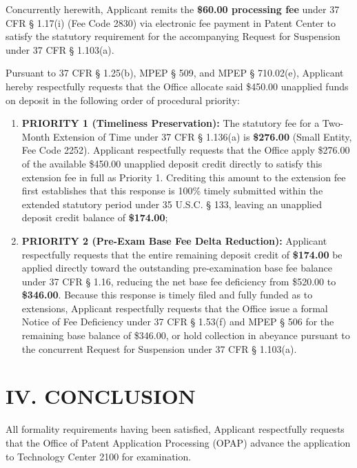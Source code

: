 \documentclass[11pt,letterpaper]{article}
\begin{document}
Concurrently herewith, Applicant remits the \textbf{\$60.00 processing fee} under 37 CFR \S{} 1.17(i) (Fee Code 2830) via electronic fee payment in Patent Center to satisfy the statutory requirement for the accompanying Request for Suspension under 37 CFR \S{} 1.103(a).

Pursuant to 37 CFR \S{} 1.25(b), MPEP \S{} 509, and MPEP \S{} 710.02(e), Applicant hereby respectfully requests that the Office allocate said \$450.00 unapplied funds on deposit in the following order of procedural priority:
\begin{enumerate}[leftmargin=*]
    \item \textbf{PRIORITY 1 (Timeliness Preservation):} The statutory fee for a Two-Month Extension of Time under 37 CFR \S{} 1.136(a) is \textbf{\$276.00} (Small Entity, Fee Code 2252). Applicant respectfully requests that the Office apply \$276.00 of the available \$450.00 unapplied deposit credit directly to satisfy this extension fee in full as Priority 1. Crediting this amount to the extension fee first establishes that this response is 100\% timely submitted within the extended statutory period under 35 U.S.C. \S{} 133, leaving an unapplied deposit credit balance of \textbf{\$174.00};
    \item \textbf{PRIORITY 2 (Pre-Exam Base Fee Delta Reduction):} Applicant respectfully requests that the entire remaining deposit credit of \textbf{\$174.00} be applied directly toward the outstanding pre-examination base fee balance under 37 CFR \S{} 1.16, reducing the net base fee deficiency from \$520.00 to \textbf{\$346.00}. Because this response is timely filed and fully funded as to extensions, Applicant respectfully requests that the Office issue a formal Notice of Fee Deficiency under 37 CFR \S{} 1.53(f) and MPEP \S{} 506 for the remaining base balance of \$346.00, or hold collection in abeyance pursuant to the concurrent Request for Suspension under 37 CFR \S{} 1.103(a).
\end{enumerate}

\section*{IV. CONCLUSION}

All formality requirements having been satisfied, Applicant respectfully requests that the Office of Patent Application Processing (OPAP) advance the application to Technology Center 2100 for examination.
\end{document}
